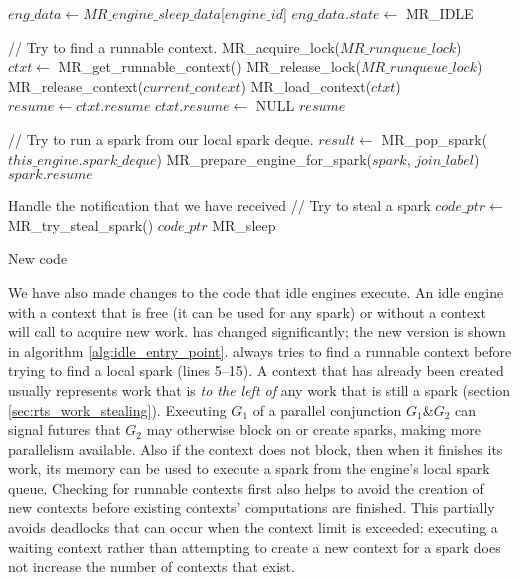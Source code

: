 \begin{algorithm}[tbp]
\begin{algorithmic}[1]
        \State $eng\_data \gets MR\_engine\_sleep\_data$[$engine\_id$]
        \State $eng\_data.state \gets$ MR\_IDLE 

        \State \State // Try to find a runnable context.
        \State MR\_acquire\_lock($MR\_runqueue\_lock$)
        \State $ctxt \gets$ MR\_get\_runnable\_context()
        \State MR\_release\_lock($MR\_runqueue\_lock$)
                \State MR\_release\_context($current\_context$)
            \EndIf
            \State MR\_load\_context($ctxt$)
            \State $resume \gets ctxt.resume$
            \State $ctxt.resume \gets$ NULL
            \Goto $resume$
        \EndIf
       
        \State \State // Try to run a spark from our local spark deque.
        \State $result \gets$ MR\_pop\_spark($this\_engine.spark\_deque$)
            \State MR\_prepare\_engine\_for\_spark($spark$, $join\_label$)
            \Goto $spark.resume$
        \EndIf

        \State
            \State Handle the notification that we have received
        \EndIf
        \State // Try to steal a spark
        \State $code\_ptr \gets$ MR\_try\_steal\_spark()
            \Goto $code\_ptr$
        \EndIf
        \Goto MR\_sleep
    \EndProcedure
\end{algorithmic}
\caption{New \idle code}
\label{alg:idle_entry_point}
\end{algorithm}

We have also made changes to the code that idle engines execute.
An idle engine with a context that is free (it can be used for any spark) or
without a context will call \idle to acquire new work.
\idle has changed significantly;
the new version is shown in algorithm \ref{alg:idle_entry_point}.
\idle always tries to find a runnable context before trying to find a local
spark (lines 5--15).
A context that has already been created usually represents work that is
\emph{to the left of}
any work that is still a spark (section \ref{sec:rts_work_stealing}).
Executing $G_1$ of a parallel conjunction $G_1 \& G_2$ can signal futures
that $G_2$ may otherwise block on or create sparks,
making more parallelism available.
Also if the context does not block, then when it finishes its work,
its memory can be used to execute a spark from the engine's local spark queue.
Checking for runnable contexts first also helps to avoid the creation of new
contexts before existing contexts' computations are finished.
This partially avoids deadlocks that can occur when the context limit is
exceeded:
executing a waiting context rather than attempting to create a new context
for a spark does not increase the number of contexts that exist.

